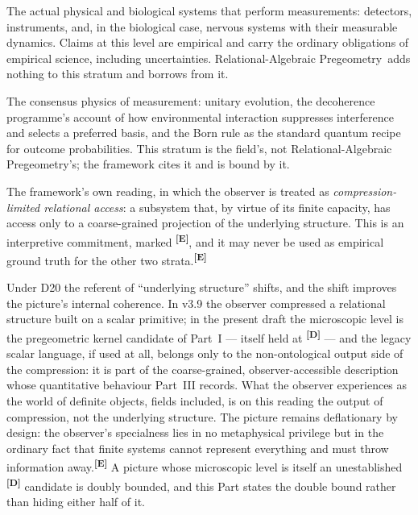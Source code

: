 \documentclass[12pt,a4paper,twoside]{article}
\theoremstyle{plain}
\theoremstyle{definition}
\theoremstyle{remark}
\newcommand{\ProjectShort}{Relational-Algebraic Pregeometry}
\newcommand{\RAP}{\ProjectShort}
\newcommand{\catmark}[1]{\textsuperscript{\textsf{\textbf{[#1]}}}}
\begin{document}
\begin{description}[leftmargin=1.4em,style=nextline]
\item[Stratum~I: Empirical observer systems.] The actual physical and
biological systems that perform measurements: detectors, instruments,
and, in the biological case, nervous systems with their measurable
dynamics. Claims at this level are empirical and carry the ordinary
obligations of empirical science, including uncertainties. \RAP\ adds
nothing to this stratum and borrows from it.
\item[Stratum~II: Standard quantum and decoherence formalism.] The
consensus physics of measurement: unitary evolution, the decoherence
programme's account of how environmental interaction suppresses
interference and selects a preferred basis, and the Born rule as the
standard quantum recipe for outcome probabilities. This stratum is the
field's, not \RAP's; the framework cites it and is bound by it.
\item[Stratum~III: The \RAP\ interpretation.] The framework's own
reading, in which the observer is treated as \emph{compression-limited
relational access}: a subsystem that, by virtue of its finite capacity,
has access only to a coarse-grained projection of the underlying
structure. This is an interpretive commitment, marked \catmark{E}, and
it may never be used as empirical ground truth for the other two
strata.\catmark{E}
\end{description}

\noindent Under D20 the referent of ``underlying structure'' shifts, and
the shift improves the picture's internal coherence. In v3.9 the
observer compressed a relational structure built on a scalar primitive; in
the present draft the microscopic level is the pregeometric
kernel candidate of Part~I --- itself held at \catmark{D} --- and the
legacy scalar language, if used at all, belongs only to the non-ontological output side of
the compression: it is part of the coarse-grained, observer-accessible
description whose quantitative behaviour Part~III records. What the
observer experiences as the world of definite objects, fields included,
is on this reading the output of compression, not the underlying
structure. The picture remains deflationary by design: the observer's
specialness lies in no metaphysical privilege but in the ordinary fact
that finite systems cannot represent everything and must throw
information away.\catmark{E} A picture whose microscopic level is itself
an unestablished \catmark{D} candidate is doubly bounded, and this Part
states the double bound rather than hiding either half of it.
\end{document}

